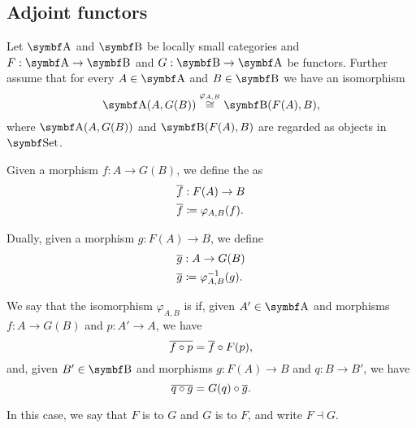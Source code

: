 \subsection{Adjoint functors}\label{subsec:adjoint_functors}

\begin{definition}\label{def:adjoint_functor}\cite[definition 2.1.1]{Leinster2014}
  Let \( \Bold A \) and \( \Bold B \) be locally small categories and \( F: \Bold A \to \Bold B \) and \( G: \Bold B \to \Bold A \) be functors. Further assume that for every \( A \in \Bold A \) and \( B \in \Bold B \) we have an isomorphism
  \begin{equation*}
    \Cat{A}(A, G(B)) \overset {\varphi_{A, B}} {\cong} \Bold{B}(F(A), B),
  \end{equation*}
  where \( \Cat{A}(A, G(B)) \) and \( \Bold{B}(F(A), B) \) are regarded as objects in \( \Bold{Set} \).

  Given a morphism \( f: A \to G(B) \), we define the  as
  \begin{align*}
    &\overline{f}: F(A) \to B \\
    &\overline{f} \coloneqq \varphi_{A, B} (f).
  \end{align*}

  Dually, given a morphism \( g: F(A) \to B \), we define
  \begin{align*}
    &\overline{g}: A \to G(B) \\
    &\overline{g} \coloneqq \varphi_{A, B}^{-1} (g).
  \end{align*}

  We say that the isomorphism \( \varphi_{A, B} \) is  if,  given \( A' \in \Bold A \) and morphisms \( f: A \to G(B) \) and \( p: A' \to A \), we have
  \begin{equation*}
    \overline{f \circ p} = \overline{f} \circ F(p),
  \end{equation*}
  and, given \( B' \in \Bold B \) and morphisms \( g: F(A) \to B \) and \( q: B \to B' \), we have
  \begin{equation*}
    \overline{q \circ g} = G(q) \circ \overline{g}.
  \end{equation*}

  In this case, we say that \( F \) is  to \( G \) and \( G \) is  to \( F \), and write \( F \dashv G \).
\end{definition}

